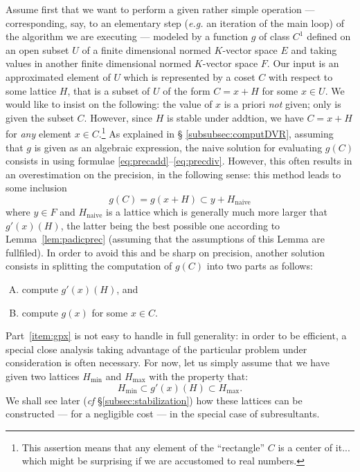 \documentclass{article}
\begin{document}
Assume first that we want to perform a given rather simple operation --- 
corresponding, say, to an elementary step (\emph{e.g.} an iteration of 
the main loop) of the algorithm we are executing --- modeled by a 
function $g$ of class $C^1$ defined on an open subset $U$ of a finite 
dimensional normed $K$-vector space $E$ and taking values in another 
finite dimensional normed $K$-vector space $F$.
Our input is an approximated element of $U$ which is represented 
by a coset $C$ with respect to some lattice $H$, that is a subset of $U$ 
of the form $C = x+H$ for some $x \in U$. We would like to insist on the 
following: the value of $x$ is a priori \emph{not} given; only is given 
the subset $C$. However, since $H$ is stable under addtion, we have $C = 
x+H$ for \emph{any} element $x \in C$.\footnote{This assertion means that 
any element of the ``rectangle'' $C$ is a center of it... which might be 
surprising if we are accustomed to real numbers.} As explained in \S 
\ref{subsubsec:computDVR}, assuming that $g$ is given as an algebraic 
expression, the naive solution for evaluating $g(C)$ consists in using 
formulae \eqref{eq:precadd}--\eqref{eq:precdiv}. However, this often 
results in an overestimation on the precision, in the following sense: 
this method leads to some inclusion
$$g(C) = g(x+H) \subset y + H_{\text{naive}}$$
where $y \in F$ and $H_{\text{naive}}$ is a lattice which is generally 
much more larger that $g'(x)(H)$, the latter being the best possible
one according to
Lemma~\ref{lem:padicprec} (assuming that the assumptions of this Lemma
are fullfiled). In order to avoid this and be sharp on
precision, another solution consists in splitting the computation of 
$g(C)$ into two parts as follows:
\begin{enumerate}[(A)]
\item \label{item:gpx} compute $g'(x)(H)$, and
\item \label{item:gx} compute $g(x)$ for some $x \in C$.
\end{enumerate}
Part~\eqref{item:gpx} is not easy to handle in full generality: in order 
to be efficient, a special close analysis taking advantage of the 
particular problem under consideration is often necessary. For now, let 
us simply assume that we have given two lattices $H_\min$ and $H_\max$ 
with the property that:
\begin{equation}
\label{eq:Hminmax}
H_\min \subset g'(x)(H) \subset H_\max.
\end{equation}
We shall see later (\emph{cf} \S \ref{subsec:stabilization}) how these
lattices can be constructed --- for a negligible cost --- in the special 
case of subresultants. 
\end{document}
